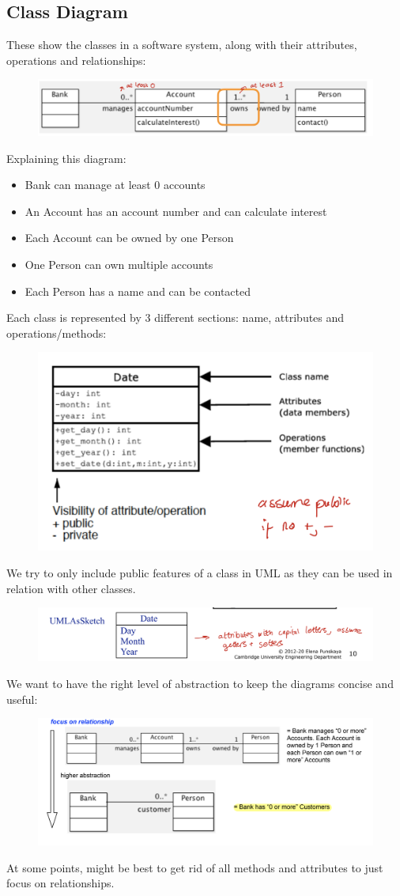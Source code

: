 \documentclass{article}
\begin{document}
\subsection{Class Diagram}
These show the classes in a software system, along with their attributes, operations and relationships:
\begin{figure}[H]
\centering
\includegraphics[width = 0.8\linewidth]{Pictures/Screenshot 2023-01-27 at 12.09.45.png}
\end{figure}
Explaining this diagram: 
\begin{itemize}
    \item Bank can manage at least 0 accounts
    \item An Account has an account number and can calculate interest
    \item Each Account can be owned by one Person
    \item One Person can own multiple accounts
    \item Each Person has a name and can be contacted
\end{itemize}
Each class is represented by 3 different sections: name, attributes and operations/methods:
\begin{figure}[H]
\centering
\includegraphics[width = 0.6\linewidth]{Pictures/Screenshot 2023-01-27 at 12.12.02.png}
\end{figure}
We try to only include public features of a class in UML as they can be used in relation with other classes.
\begin{figure}[H]
\centering
\includegraphics[width = 0.6\linewidth]{Pictures/Screenshot 2023-01-27 at 12.13.24.png}
\end{figure}
We want to have the right level of abstraction to keep the diagrams concise and useful:
\begin{figure}[H]
\centering
\includegraphics[width = 0.6\linewidth]{Pictures/Screenshot 2023-01-27 at 12.16.58.png}
\end{figure}
At some points, might be best to get rid of all methods and attributes to just focus on relationships.
\end{document}
